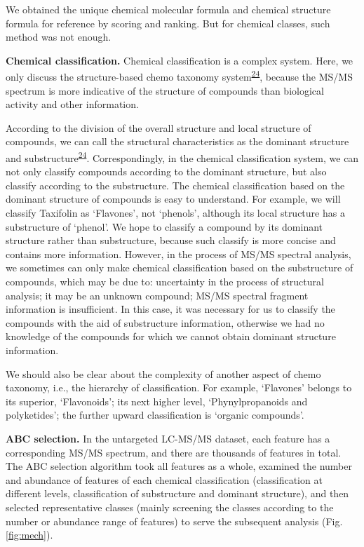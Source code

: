 \documentclass[
]{article}
\begin{document}
We obtained the unique chemical molecular formula and chemical structure
formula for reference by scoring and ranking. But for chemical classes,
such method was not enough.

\textbf{Chemical classification.} Chemical classification is a complex
system. Here, we only discuss the structure-based chemo taxonomy
system\textsuperscript{\protect\hyperlink{ref-2016}{24}}, because the
MS/MS spectrum is more indicative of the structure of compounds than
biological activity and other information.

According to the division of the overall structure and local structure
of compounds, we can call the structural characteristics as the dominant
structure and
substructure\textsuperscript{\protect\hyperlink{ref-2016}{24}}.
Correspondingly, in the chemical classification system, we can not only
classify compounds according to the dominant structure, but also
classify according to the substructure. The chemical classification
based on the dominant structure of compounds is easy to understand. For
example, we will classify Taxifolin as `Flavones', not `phenols',
although its local structure has a substructure of `phenol'. We hope to
classify a compound by its dominant structure rather than substructure,
because such classify is more concise and contains more information.
However, in the process of MS/MS spectral analysis, we sometimes can
only make chemical classification based on the substructure of
compounds, which may be due to: uncertainty in the process of structural
analysis; it may be an unknown compound; MS/MS spectral fragment
information is insufficient. In this case, it was necessary for us to
classify the compounds with the aid of substructure information,
otherwise we had no knowledge of the compounds for which we cannot
obtain dominant structure information.

We should also be clear about the complexity of another aspect of chemo
taxonomy, i.e., the hierarchy of classification. For example, `Flavones'
belongs to its superior, `Flavonoids'; its next higher level,
`Phynylpropanoids and polyketides'; the further upward classification is
`organic compounds'.

\textbf{ABC selection.} In the untargeted LC-MS/MS dataset, each feature
has a corresponding MS/MS spectrum, and there are thousands of features
in total. The ABC selection algorithm took all features as a whole,
examined the number and abundance of features of each chemical
classification (classification at different levels, classification of
substructure and dominant structure), and then selected representative
classes (mainly screening the classes according to the number or
abundance range of features) to serve the subsequent analysis (Fig.
\ref{fig:mech}).
\end{document}
